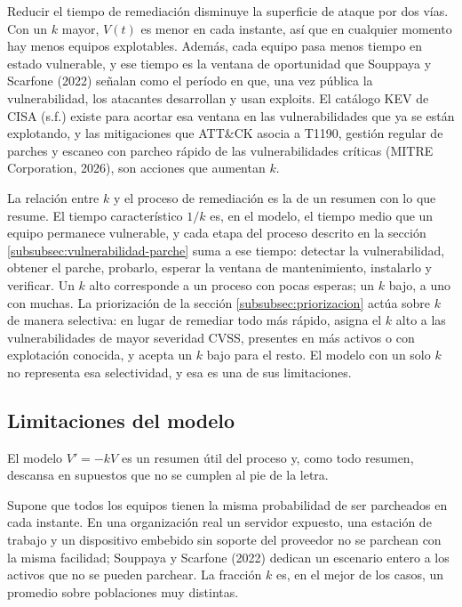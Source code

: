 Reducir el tiempo de remediación disminuye la superficie de ataque por dos vías. Con un $k$
mayor, $V(t)$ es menor en cada instante, así que en cualquier momento hay menos equipos
explotables. Además, cada equipo pasa menos tiempo en estado vulnerable, y ese tiempo es la
ventana de oportunidad que Souppaya y Scarfone (2022) señalan
como el período en que, una vez pública la vulnerabilidad, los atacantes desarrollan y usan
exploits. El catálogo KEV de CISA (s.f.) existe para acortar esa ventana en las vulnerabilidades
que ya se están explotando, y las mitigaciones que ATT\&CK asocia a T1190, gestión regular de
parches y escaneo con parcheo rápido de las vulnerabilidades críticas (MITRE Corporation, 2026),
son acciones que aumentan $k$.

La relación entre $k$ y el proceso de remediación es la de un resumen con lo que resume. El
tiempo característico $1/k$ es, en el modelo, el tiempo medio que un equipo permanece
vulnerable, y cada etapa del proceso descrito en la sección
\ref{subsubsec:vulnerabilidad-parche} suma a ese tiempo: detectar la vulnerabilidad, obtener
el parche, probarlo, esperar la ventana de mantenimiento, instalarlo y verificar. Un $k$ alto
corresponde a un proceso con pocas esperas; un $k$ bajo, a uno con muchas. La priorización de la
sección \ref{subsubsec:priorizacion} actúa sobre $k$ de manera selectiva: en lugar de remediar todo
más rápido, asigna el $k$ alto a las vulnerabilidades de mayor severidad CVSS, presentes en más
activos o con explotación conocida, y acepta un $k$ bajo para el resto. El modelo con un
solo $k$ no representa esa selectividad, y esa es una de sus limitaciones.

\subsection{Limitaciones del modelo}
\label{subsec:dis-limitaciones}

El modelo $V' = -kV$ es un resumen útil del proceso y, como todo resumen, descansa en supuestos
que no se cumplen al pie de la letra.

Supone que todos los equipos tienen la misma probabilidad de ser parcheados en cada instante.
En una organización real un servidor expuesto, una estación de trabajo y un dispositivo
embebido sin soporte del proveedor no se parchean con la misma facilidad; Souppaya y Scarfone
(2022) dedican un escenario entero a los activos que no se pueden parchear. La fracción $k$ es,
en el mejor de los casos, un promedio sobre poblaciones muy distintas.

